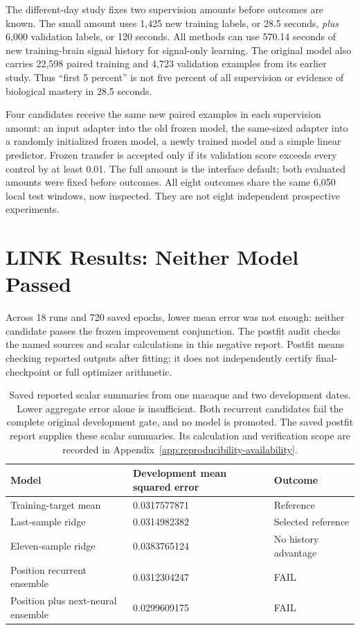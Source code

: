 The different-day study fixes two supervision amounts before outcomes are
known. The small amount uses 1,425 new training labels, or 28.5 seconds, \emph{plus}
6,000 validation labels, or 120 seconds. All methods can use 570.14 seconds of
new training-brain signal history for signal-only learning. The original model
also carries 22,598 paired training and 4,723 validation examples from its
earlier study. Thus ``first 5 percent'' is not five percent of all supervision
or evidence of biological mastery in 28.5 seconds.

Four candidates receive the same new paired examples in each supervision
amount: an input adapter into the old frozen model, the same-sized adapter into
a randomly initialized frozen model, a newly trained model and a simple linear
predictor. Frozen transfer is accepted only if its validation score exceeds
every control by at least 0.01. The full amount is the interface default;
both evaluated amounts were fixed before outcomes. All eight outcomes share
the same 6,050 local test windows, now inspected. They are not eight independent
prospective experiments.

\section{LINK Results: Neither Model Passed}

Across 18 runs and 720 saved epochs, lower mean error was not enough: neither candidate passes the frozen improvement conjunction. The postfit audit checks the named sources and scalar calculations in this negative report. Postfit means checking reported outputs after fitting; it does not independently certify final-checkpoint or full optimizer arithmetic.

\begin{table}[t]
\centering\small
\begin{tabular}{p{.40\linewidth}p{.28\linewidth}p{.24\linewidth}}
\toprule Model & Development mean squared error & Outcome\\\midrule
Training-target mean &0.0317577871&Reference\\
Last-sample ridge &0.0314982382&Selected reference\\
Eleven-sample ridge &0.0383765124&No history advantage\\
Position recurrent ensemble &0.0312304247&FAIL\\
Position plus next-neural ensemble &0.0299609175&FAIL\\\bottomrule
\end{tabular}
\caption{Saved reported scalar summaries from one macaque and two development
dates. Lower aggregate error alone is insufficient. Both recurrent candidates
fail the complete original development gate, and no model is promoted. The saved postfit report supplies these scalar summaries. Its calculation and verification scope are recorded in Appendix~\ref{app:reproducibility-availability}.}
\end{table}

